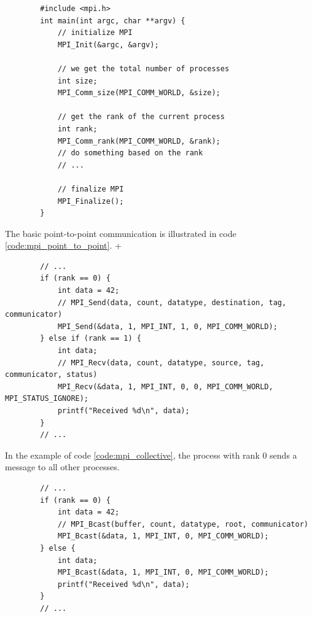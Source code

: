 \begin{codebox}[!htb]
    \begin{verbatim}
        #include <mpi.h>
        int main(int argc, char **argv) {
            // initialize MPI
            MPI_Init(&argc, &argv);

            // we get the total number of processes
            int size;
            MPI_Comm_size(MPI_COMM_WORLD, &size);

            // get the rank of the current process
            int rank;
            MPI_Comm_rank(MPI_COMM_WORLD, &rank);
            // do something based on the rank
            // ...

            // finalize MPI
            MPI_Finalize();
        }
    \end{verbatim}
    \caption{Basic structure of an MPI program.}
    \label{code:mpi_program}
\end{codebox}

The basic point-to-point communication is illustrated in code \ref{code:mpi_point_to_point}.
+

\begin{codebox}[!htb]
    \begin{verbatim}
        // ...
        if (rank == 0) {
            int data = 42;
            // MPI_Send(data, count, datatype, destination, tag, communicator)
            MPI_Send(&data, 1, MPI_INT, 1, 0, MPI_COMM_WORLD);
        } else if (rank == 1) {
            int data;
            // MPI_Recv(data, count, datatype, source, tag, communicator, status)
            MPI_Recv(&data, 1, MPI_INT, 0, 0, MPI_COMM_WORLD, MPI_STATUS_IGNORE);
            printf("Received %d\n", data);
        }
        // ...
    \end{verbatim}
    \caption{Basic point-to-point communication in MPI.}
    \label{code:mpi_point_to_point}
\end{codebox}

In the example of code \ref{code:mpi_collective}, the process with rank $0$ sends
a message to all other processes.

\begin{codebox}[!htb]
    \begin{verbatim}
        // ...
        if (rank == 0) {
            int data = 42;
            // MPI_Bcast(buffer, count, datatype, root, communicator)
            MPI_Bcast(&data, 1, MPI_INT, 0, MPI_COMM_WORLD);
        } else {
            int data;
            MPI_Bcast(&data, 1, MPI_INT, 0, MPI_COMM_WORLD);
            printf("Received %d\n", data);
        }
        // ...
    \end{verbatim}
    \caption{Basic collective communication in MPI.}
    \label{code:mpi_collective}
\end{codebox}

